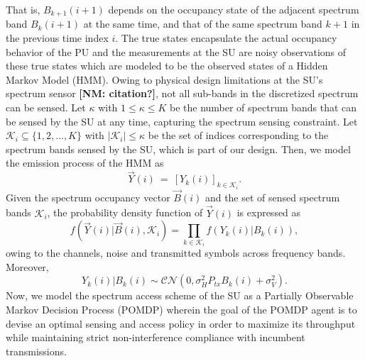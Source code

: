 \documentclass[10pt,twocolumn]{IEEEtran}
\newcommand{\nm}[1]{{\color{blue}\bf{[NM: #1]}}}
\begin{document}
That is, $B_{k+1}(i+1)$ depends on the  occupancy state of the adjacent spectrum band $B_{k}(i+1)$ at the same time, and that of the same spectrum band $k+1$ in the previous time index $i$. The true states encapsulate the actual occupancy behavior of the PU and the measurements at the SU are noisy observations of these true states which are modeled to be the observed states of a Hidden Markov Model (HMM). Owing to physical design limitations at the SU's spectrum sensor \nm{citation?}, not all sub-bands in the discretized spectrum can be sensed. Let $\kappa$ with $1\leq \kappa\leq K$ be the number of spectrum bands that can be sensed by the SU at any time, capturing the spectrum sensing constraint. Let $\mathcal K_{i}\subseteq\{1,2,\dots,K\}$ with $|\mathcal K_i|\leq \kappa$ be the set of indices corresponding to the spectrum bands sensed by the SU, which is part of our design. Then, we model the emission process of the HMM as
\begin{equation}\label{8}
    \vec{Y}(i)\ =\ [Y_k(i)]_{k\in\mathcal K_i}.
\end{equation}
Given the spectrum occupancy vector $\vec{B}(i)$ and the set of sensed spectrum bands $\mathcal K_i$, the probability density function of $\vec{Y}(i)$ is expressed as
\begin{equation}\label{9}
    f(\vec{Y}(i)|\vec{B}(i),\mathcal K_i)=\prod_{k\in\mathcal K_i}f(Y_k(i)|B_k(i)),
\end{equation}
owing to the channels, noise and transmitted symbols across frequency bands. Moreover,
\begin{equation}\label{10}
 Y_k(i)|B_k(i)\sim \mathcal{CN}(0,\sigma_H^2P_{tx}B_k(i)+\sigma_V^2).
\end{equation}
Now, we model the spectrum access scheme of the SU as a Partially Observable Markov Decision Process (POMDP) wherein the goal of the POMDP agent is to devise an optimal sensing and access policy in order to maximize its throughput while maintaining strict non-interference compliance with incumbent transmissions.
\end{document}

